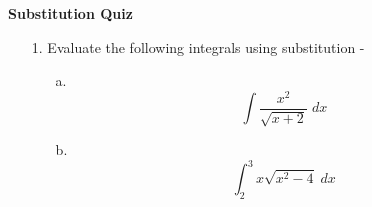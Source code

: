 \documentclass[11pt]{article}
\begin{document}
	
	
	
	
	\centerline{\textbf{\Large{Substitution Quiz}}}
	
	\vspace{0.2in}
	
	
	\begin{enumerate}
		
		\item[1.]Evaluate the following integrals using substitution -
		\begin{enumerate}
			\item[a.] $$ \int \frac{x^2}{\sqrt{x +  2}} \; dx$$ 
			\vspace{8cm}
			\item[b.] $$\int_{2}^{3} x\sqrt{x^2 - 4} \; dx$$
		\end{enumerate}
		
	\end{enumerate}
	
	
	
	
	
	
	
	
\end{document}
